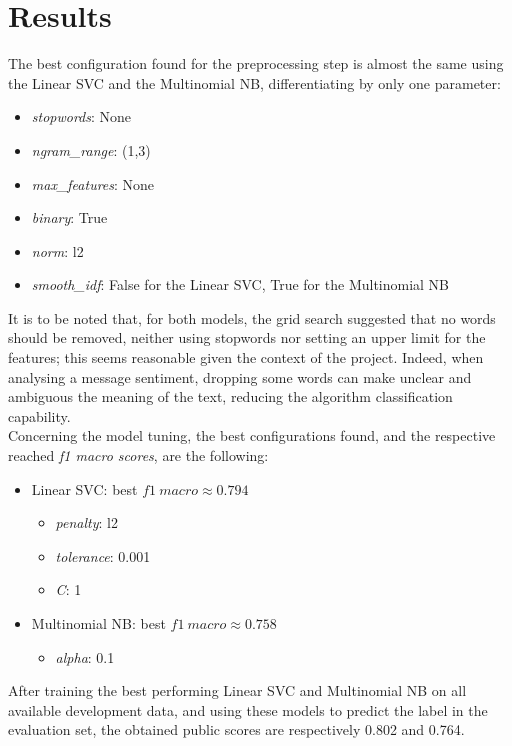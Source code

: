 \documentclass[conference]{IEEEtran}
\begin{document}
\section{Results}
The best configuration found for the preprocessing step is almost the same using the Linear SVC and the Multinomial NB, differentiating by only one parameter:
\begin{itemize}
    \item \textit{stopwords}: None 
    \item \textit{ngram\_range}: (1,3)
    \item \textit{max\_features}: None
    \item \textit{binary}: True
    \item \textit{norm}: l2
    \item \textit{smooth\_idf}: False for the Linear SVC, True for the Multinomial NB
\end{itemize}
It is to be noted that, for both models, the grid search suggested that no words should be removed, neither using stopwords nor setting an upper limit for the features; this seems reasonable given the context of the project. Indeed, when analysing a message sentiment, dropping some words can make unclear and ambiguous the meaning of the text, reducing the algorithm classification capability.\\
Concerning the model tuning, the best configurations found, and the respective reached \textit{f1 macro scores}, are the following:
\begin{itemize}
    \item Linear SVC: best $f1\:macro \approx 0.794$
    \begin{itemize}
        \item \textit{penalty}: l2
        \item \textit{tolerance}: 0.001
        \item \textit{C}: 1
    \end{itemize}
    \item Multinomial NB: best $f1\:macro \approx 0.758$
    \begin{itemize}
        \item \textit{alpha}: 0.1
    \end{itemize}
\end{itemize}
After training the best performing Linear SVC and Multinomial NB on all available development data, and using these models to predict the label in the evaluation set, the obtained public scores are respectively 0.802 and 0.764. \\
\end{document}
